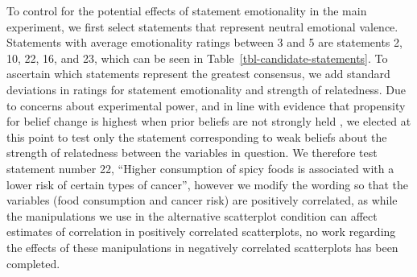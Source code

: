 \documentclass[manuscript,screen,review,anonymous]{acmart}
\begin{document}
To control for the potential effects of statement emotionality in the
main experiment, we first select statements that represent neutral
emotional valence. Statements with average emotionality ratings between
3 and 5 are statements 2, 10, 22, 16, and 23, which can be seen in
Table~\ref{tbl-candidate-statements}. To ascertain which statements
represent the greatest consensus, we add standard deviations in ratings
for statement emotionality and strength of relatedness. Due to concerns
about experimental power, and in line with evidence that propensity for
belief change is highest when prior beliefs are not strongly held
\citep{xiong_2022, markant_2023}, we elected at this point to test only
the statement corresponding to weak beliefs about the strength of
relatedness between the variables in question. We therefore test
statement number 22, ``Higher consumption of spicy foods is associated
with a lower risk of certain types of cancer'', however we modify the
wording so that the variables (food consumption and cancer risk) are
positively correlated, as while the manipulations we use in the
alternative scatterplot condition can affect estimates of correlation in
positively correlated scatterplots, no work regarding the effects of
these manipulations in negatively correlated scatterplots has been
completed.

\begin{table}

\caption{\label{tbl-candidate-statements}Statements with neutral average
emotionality ratings.}


\end{table}%
\end{document}
